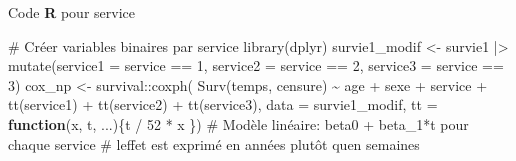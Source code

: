 \documentclass[
  ignorenonframetext,
]{beamer}
\newenvironment{Shaded}{\begin{snugshade}}{\end{snugshade}}
\newcommand{\AttributeTok}[1]{\textcolor[rgb]{0.40,0.45,0.13}{#1}}
\newcommand{\CommentTok}[1]{\textcolor[rgb]{0.37,0.37,0.37}{#1}}
\newcommand{\ControlFlowTok}[1]{\textcolor[rgb]{0.00,0.23,0.31}{\textbf{#1}}}
\newcommand{\DecValTok}[1]{\textcolor[rgb]{0.68,0.00,0.00}{#1}}
\newcommand{\FunctionTok}[1]{\textcolor[rgb]{0.28,0.35,0.67}{#1}}
\newcommand{\NormalTok}[1]{\textcolor[rgb]{0.00,0.23,0.31}{#1}}
\newcommand{\OtherTok}[1]{\textcolor[rgb]{0.00,0.23,0.31}{#1}}
\newcommand{\SpecialCharTok}[1]{\textcolor[rgb]{0.37,0.37,0.37}{#1}}
\begin{document}
\begin{frame}[fragile]{Code \textbf{R} pour service}
\protect{}\label{code-r-pour-service}
\begin{Shaded}
\begin{Highlighting}[numbers=left,,]
\CommentTok{\# Créer variables binaires par service}
\FunctionTok{library}\NormalTok{(dplyr)}
\NormalTok{survie1\_modif }\OtherTok{\textless{}{-}}\NormalTok{ survie1 }\SpecialCharTok{|\textgreater{}}
  \FunctionTok{mutate}\NormalTok{(}\AttributeTok{service1 =}\NormalTok{ service }\SpecialCharTok{==} \DecValTok{1}\NormalTok{,}
         \AttributeTok{service2 =}\NormalTok{ service }\SpecialCharTok{==} \DecValTok{2}\NormalTok{,}
         \AttributeTok{service3 =}\NormalTok{ service }\SpecialCharTok{==} \DecValTok{3}\NormalTok{)}
\NormalTok{cox\_np }\OtherTok{\textless{}{-}}\NormalTok{ survival}\SpecialCharTok{::}\FunctionTok{coxph}\NormalTok{(}
    \FunctionTok{Surv}\NormalTok{(temps, censure) }\SpecialCharTok{\textasciitilde{}} 
\NormalTok{     age }\SpecialCharTok{+}\NormalTok{ sexe }\SpecialCharTok{+}\NormalTok{ service }\SpecialCharTok{+} 
      \FunctionTok{tt}\NormalTok{(service1) }\SpecialCharTok{+} \FunctionTok{tt}\NormalTok{(service2) }\SpecialCharTok{+} \FunctionTok{tt}\NormalTok{(service3), }
     \AttributeTok{data =}\NormalTok{ survie1\_modif, }
     \AttributeTok{tt =} \ControlFlowTok{function}\NormalTok{(x, t, ...)\{t }\SpecialCharTok{/} \DecValTok{52} \SpecialCharTok{*}\NormalTok{ x \})}
\CommentTok{\# Modèle linéaire: beta0 + beta\_1*t pour chaque service}
\CommentTok{\# l\textquotesingle{}effet est exprimé en années plutôt qu\textquotesingle{}en semaines}
\end{Highlighting}
\end{Shaded}
\end{frame}
\end{document}

